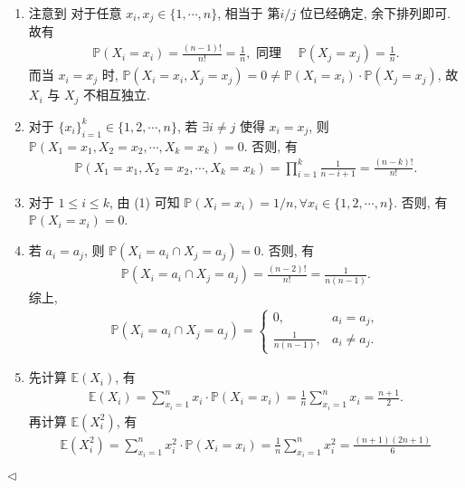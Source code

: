 \documentclass[11pt]{article}
\newenvironment{answer}[1][Solution]{\begin{trivlist}
    \item[\hskip \labelsep {\bfseries #1.}\hskip \labelsep]}{\hfill$\lhd$\end{trivlist}}
\newcommand\1{\mathds{1}}
\newcommand\E{\mathbb{E}}
\newcommand\PP{\mathbb{P}}
\begin{document}
\begin{answer}
    \begin{enumerate}[label=(\arabic*)]
        \item 注意到 对于任意 $x_i, x_j \in \{1,\cdots, n\}$, 相当于 第$i/j$ 位已经确定, 余下排列即可. 故有
        \begin{align*}
            \PP(X_i = x_i) = \frac{(n-1)!}{n!} = \frac{1}{n}, \text{ 同理 }\quad  \PP(X_j = x_j) = \frac{1}{n}.
        \end{align*}
        而当 $x_i = x_j$ 时, $\PP(X_i = x_i, X_j = x_j) = 0 \neq \PP(X_i = x_i) \cdot \PP(X_j = x_j)$, 故 $X_i$ 与 $X_j$ 不相互独立. 
        \item 对于 $\{x_i\}_{i=1}^k \in \{1,2, \cdots, n\}$, 若 $\exists i\neq j$ 使得 $x_i = x_j$, 则 $\PP(X_1 = x_1, X_2 = x_2, \cdots, X_k = x_k) = 0$. 否则, 有
        \begin{align*}
            \PP(X_1 = x_1, X_2 = x_2, \cdots, X_k = x_k) = \prod_{i=1}^{k} \frac{1}{n-i+1} = \frac{(n-k)!}{n!}.
        \end{align*} 
        \item 对于 $1\le i\le k$, 由 (1) 可知 $\PP(X_i = x_i) = 1/n, \forall x_i \in \{1,2, \cdots, n\}$. 否则, 有 $\PP(X_i = x_i) = 0$.
        \item 若 $a_i = a_j$, 则 $\PP(X_i = a_i \cap X_j = a_j) = 0$. 否则, 有
        \begin{align*}
            \PP(X_i = a_i \cap X_j = a_j) = \frac{(n-2)!}{n!} = \frac{1}{n(n-1)}.
        \end{align*}
        综上,
        \begin{align*}
            \PP(X_i = a_i \cap X_j = a_j) = \begin{cases}
                0, & a_i = a_j, \\
                \frac{1}{n(n-1)}, & a_i \neq a_j.
            \end{cases}
        \end{align*}
        \item 先计算 $\E(X_i)$, 有
        \begin{align*}
            \E(X_i) = \sum_{x_i=1}^{n} x_i \cdot \PP(X_i = x_i) = \frac{1}{n} \sum_{x_i=1}^{n} x_i = \frac{n+1}{2}.
        \end{align*}
        再计算 $\E(X_i^2)$, 有
        \begin{align*}
            \E(X_i^2) = \sum_{x_i=1}^{n} x_i^2 \cdot \PP(X_i = x_i) = \frac{1}{n} \sum_{x_i=1}^{n} x_i^2 = \frac{(n+1)(2n+1)}{6}
        \end{align*}

\end{enumerate}
\end{answer}
\end{document}
